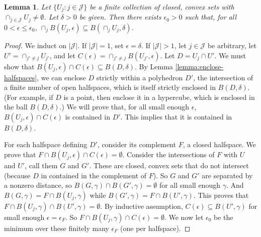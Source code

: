 \documentclass[11pt]{article}
\newtheorem{lemma}{Lemma}
\begin{document}
\begin{lemma} \label{lemma:thick-nonempty}
  Let $\{U_j : j \in \mathcal{J}\}$ be a finite collection of closed, convex sets with $\cap_{j\in\mathcal{J}} U_j \neq \emptyset$.
  Let $\delta > 0$ be given.
  Then there exists  $\epsilon_0 > 0$ such that, for all $0 < \epsilon \leq \epsilon_0$, $\cap_j B(U_j,\epsilon) \subseteq B(\cap_j U_j, \delta)$.
\end{lemma}
\begin{proof}
  We induct on $|\mathcal{J}|$.
  If $|\mathcal{J}|=1$, set $\epsilon = \delta$.
  If $|\mathcal{J}|>1$, let $j\in\mathcal{J}$ be arbitrary, let $U' = \cap_{j'\neq j} U_{j'}$, and let $C(\epsilon) = \cap_{j' \neq j} B(U_{j'},\epsilon)$.
  Let $D = U_j \cap U'$.
  We must show that $B(U_j,\epsilon) \cap C(\epsilon) \subseteq B(D,\delta)$.
  By Lemma \ref{lemma:enclose-halfspaces}, we can enclose $D$ strictly within a polyhedron $D'$, the intersection of a finite number of open halfspaces, which is itself strictly enclosed in $B(D,\delta)$.
  (For example, if $D$ is a point, then enclose it in a hypercube, which is enclosed in the ball $B(D,\delta)$.)
  We will prove that, for all small enough $\epsilon$, $B(U_j,\epsilon) \cap C(\epsilon)$ is contained in $D'$.
  This implies that it is contained in $B(D,\delta)$.

  For each halfspace defining $D'$, consider its complement $F$, a closed halfspace.
  We prove that $F \cap B(U_j,\epsilon) \cap C(\epsilon) = \emptyset$.
  Consider the intersections of $F$ with $U$ and $U'$, call them $G$ and $G'$.
  These are closed, convex sets that do not intersect (because $D$ in contained in the complement of $F$).
  So $G$ and $G'$ are separated by a nonzero distance, so $B(G,\gamma) \cap B(G',\gamma) = \emptyset$ for all small enough $\gamma$.
  And $B(G,\gamma) = F \cap B(U_j,\gamma)$ while $B(G',\gamma) = F \cap B(U',\gamma)$.
  This proves that $F \cap B(U_j,\gamma) \cap B(U',\gamma) = \emptyset$.
  By inductive assumption, $C(\epsilon) \subseteq B(U',\gamma)$ for small enough $\epsilon = \epsilon_F$.
  So $F \cap B(U_j,\gamma) \cap C(\epsilon) = \emptyset$.
  We now let $\epsilon_0$ be the minimum over these finitely many $\epsilon_F$ (one per halfspace).
\end{proof}
\end{document}
